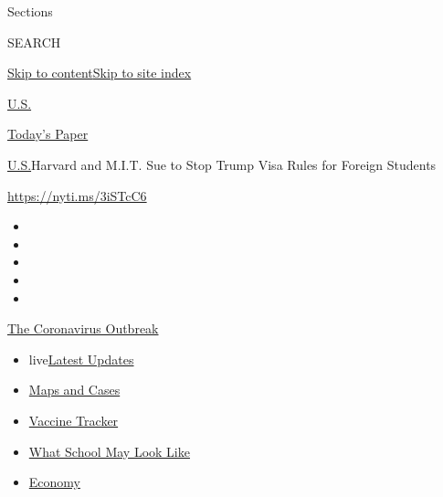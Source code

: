Sections

SEARCH

\protect\hyperlink{site-content}{Skip to
content}\protect\hyperlink{site-index}{Skip to site index}

\href{https://www.nytimes.com/section/us}{U.S.}

\href{https://myaccount.nytimes.com/auth/login?response_type=cookie\&client_id=vi}{}

\href{https://www.nytimes.com/section/todayspaper}{Today's Paper}

\href{/section/us}{U.S.}\textbar{}Harvard and M.I.T. Sue to Stop Trump
Visa Rules for Foreign Students

\url{https://nyti.ms/3iSTcC6}

\begin{itemize}
\item
\item
\item
\item
\item
\end{itemize}

\href{https://www.nytimes.com/news-event/coronavirus?action=click\&pgtype=Article\&state=default\&region=TOP_BANNER\&context=storylines_menu}{The
Coronavirus Outbreak}

\begin{itemize}
\tightlist
\item
  live\href{https://www.nytimes.com/2020/08/02/world/coronavirus-updates.html?action=click\&pgtype=Article\&state=default\&region=TOP_BANNER\&context=storylines_menu}{Latest
  Updates}
\item
  \href{https://www.nytimes.com/interactive/2020/us/coronavirus-us-cases.html?action=click\&pgtype=Article\&state=default\&region=TOP_BANNER\&context=storylines_menu}{Maps
  and Cases}
\item
  \href{https://www.nytimes.com/interactive/2020/science/coronavirus-vaccine-tracker.html?action=click\&pgtype=Article\&state=default\&region=TOP_BANNER\&context=storylines_menu}{Vaccine
  Tracker}
\item
  \href{https://www.nytimes.com/interactive/2020/07/29/us/schools-reopening-coronavirus.html?action=click\&pgtype=Article\&state=default\&region=TOP_BANNER\&context=storylines_menu}{What
  School May Look Like}
\item
  \href{https://www.nytimes.com/live/2020/07/31/business/stock-market-today-coronavirus?action=click\&pgtype=Article\&state=default\&region=TOP_BANNER\&context=storylines_menu}{Economy}
\end{itemize}

